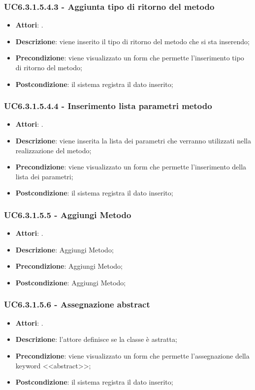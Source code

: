 \subsubsection{UC6.3.1.5.4.3 - Aggiunta tipo di ritorno del metodo} 
\label{sssec:UC6.3.1.5.4.3} 
\begin{itemize} 
\item \textbf{Attori}: .
\item \textbf{Descrizione}: viene inserito il tipo di ritorno del metodo che si sta inserendo;
\item \textbf{Precondizione}: viene visualizzato un form che permette l'inserimento tipo di ritorno del metodo;
\item \textbf{Postcondizione}: il sistema registra il dato inserito;
\end{itemize} 
\subsubsection{UC6.3.1.5.4.4 - Inserimento lista parametri metodo} 
\label{sssec:UC6.3.1.5.4.4} 
\begin{itemize} 
\item \textbf{Attori}: .
\item \textbf{Descrizione}: viene inserita la lista dei parametri che verranno utilizzati nella realizzazione del metodo;
\item \textbf{Precondizione}: viene visualizzato un form che permette l'inserimento della lista dei parametri;
\item \textbf{Postcondizione}: il sistema registra il dato inserito;
\end{itemize} 
\subsubsection{UC6.3.1.5.5 - Aggiungi Metodo} 
\label{sssec:UC6.3.1.5.5} 
\begin{itemize} 
\item \textbf{Attori}: .
\item \textbf{Descrizione}: Aggiungi Metodo;
\item \textbf{Precondizione}: Aggiungi Metodo;
\item \textbf{Postcondizione}: Aggiungi Metodo;
\end{itemize} 
\subsubsection{UC6.3.1.5.6 - Assegnazione abstract} 
\label{sssec:UC6.3.1.5.6} 
\begin{itemize} 
\item \textbf{Attori}: .
\item \textbf{Descrizione}: l'attore definisce se la classe è astratta;
\item \textbf{Precondizione}: viene visualizzato un form che permette l'assegnazione della keyword <<abstract>>;
\item \textbf{Postcondizione}: il sistema registra il dato inserito;
\end{itemize} 

